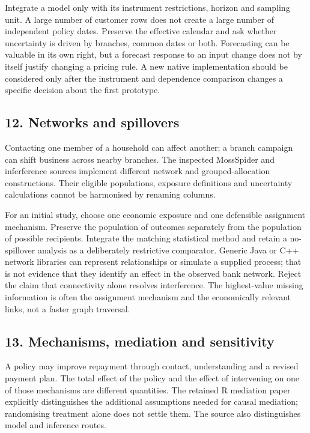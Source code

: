 Integrate a model only with its instrument restrictions, horizon and sampling
unit. A large number of customer rows does not create a large number of
independent policy dates. Preserve the effective calendar and ask whether
uncertainty is driven by branches, common dates or both. Forecasting can be
valuable in its own right, but a forecast response to an input change does not
by itself justify changing a pricing rule. A new native implementation should
be considered only after the instrument and dependence comparison changes a
specific decision about the first prototype.

\subsection{12. Networks and spillovers}
Contacting one member of a household can affect another; a branch campaign can
shift business across nearby branches. The inspected MossSpider and
inferference sources implement different network and grouped-allocation
constructions. Their eligible populations, exposure definitions and uncertainty
calculations cannot be harmonised by renaming columns.
\citep{exec24_interference_mossspider,exec24_interference_inferference}

For an initial study, choose one economic exposure and one defensible assignment
mechanism. Preserve the population of outcomes separately from the population
of possible recipients. Integrate the matching statistical method and retain
a no-spillover analysis as a deliberately restrictive comparator. Generic Java
or C++ network libraries can represent relationships or simulate a supplied
process; that is not evidence that they identify an effect in the observed
bank network. Reject the claim that connectivity alone resolves interference.
The highest-value missing information is often the assignment mechanism and
the economically relevant links, not a faster graph traversal.

\subsection{13. Mechanisms, mediation and sensitivity}
A policy may improve repayment through contact, understanding and a revised
payment plan. The total effect of the policy and the effect of intervening on
one of those mechanisms are different quantities. The retained R mediation
paper explicitly distinguishes the additional assumptions needed for causal
mediation; randomising treatment alone does not settle them. The source also
distinguishes model and inference routes.
\citep{exec24_mediation_original,exec24_mediation_sources}

